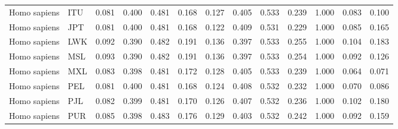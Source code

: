 \begin{longtable}{llrrrrrrrrrrr}
        Homo sapiens &                       ITU &                              0.081 &                               0.400 &                 0.481 &                 0.168 &                              0.127 &                               0.405 &                 0.533 &                 0.239 &   1.000 &  0.083 &  0.100 \\
        Homo sapiens &                       JPT &                              0.081 &                               0.400 &                 0.481 &                 0.168 &                              0.122 &                               0.409 &                 0.531 &                 0.229 &   1.000 &  0.085 &  0.165 \\
        Homo sapiens &                       LWK &                              0.092 &                               0.390 &                 0.482 &                 0.191 &                              0.136 &                               0.397 &                 0.533 &                 0.255 &   1.000 &  0.104 &  0.183 \\
        Homo sapiens &                       MSL &                              0.093 &                               0.390 &                 0.482 &                 0.191 &                              0.136 &                               0.397 &                 0.533 &                 0.254 &   1.000 &  0.092 &  0.126 \\
        Homo sapiens &                       MXL &                              0.083 &                               0.398 &                 0.481 &                 0.172 &                              0.128 &                               0.405 &                 0.533 &                 0.239 &   1.000 &  0.064 &  0.071 \\
        Homo sapiens &                       PEL &                              0.081 &                               0.400 &                 0.481 &                 0.168 &                              0.124 &                               0.408 &                 0.532 &                 0.232 &   1.000 &  0.070 &  0.086 \\
        Homo sapiens &                       PJL &                              0.082 &                               0.399 &                 0.481 &                 0.170 &                              0.126 &                               0.407 &                 0.532 &                 0.236 &   1.000 &  0.102 &  0.180 \\
        Homo sapiens &                       PUR &                              0.085 &                               0.398 &                 0.483 &                 0.176 &                              0.129 &                               0.403 &                 0.532 &                 0.242 &   1.000 &  0.092 &  0.159 \\

\end{longtable}
